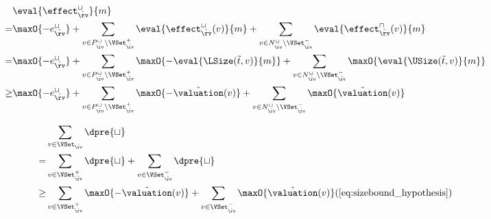 \begin{equation} \label{eq:input_rv_reduction_lower}
  \begin{split}
  & \eval{\effect^\sqcup_{\hat{\rv}}}{m} \\
  = & \maxO{-e^{\sqcup}_{\hat{\rv}}}
    + \sum_{v \in P_{\hat{\rv}}^\sqcup \setminus \VSet^+_{\hat{\rv}}} \eval{\effect^\sqcup_{\hat{\rv}}(v)}{m}
    + \sum_{v \in N_{\hat{\rv}}^\sqcup \setminus \VSet^-_{\hat{\rv}}} \eval{\effect^\sqcap_{\hat{\rv}}(v)}{m} \\
  = & \maxO{-e^{\sqcup}_{\hat{\rv}}}
    + \sum_{v \in P_{\hat{\rv}}^\sqcup \setminus \VSet^+_{\hat{\rv}}} \maxO{-\eval{\LSize(\tilde{t}, v)}{m}}
    + \sum_{v \in N_{\hat{\rv}}^\sqcup \setminus \VSet^-_{\hat{\rv}}} \maxO{\eval{\USize(\tilde{t}, v)}{m}} \\
  \geq & \maxO{-e^{\sqcup}_{\hat{\rv}}}
    + \sum_{v \in P_{\hat{\rv}}^\sqcup \setminus \VSet^+_{\hat{\rv}}} \maxO{-\tilde{\valuation}(v)}
    + \sum_{v \in N_{\hat{\rv}}^\sqcup \setminus \VSet^-_{\hat{\rv}}} \maxO{\tilde{\valuation}(v)} \\
  \end{split}
\end{equation}

\begin{equation} \label{eq:d_lower_reduction}
  \begin{split} 
  & \sum_{v \in \VSet_{\hat{\rv}}} \dpre{\sqcup} \\
  = & \sum_{v \in \VSet^+_{\hat{\rv}}} \dpre{\sqcup} + \sum_{v \in \VSet^-_{\hat{\rv}}} \dpre{\sqcup} \\
  \geq & \sum_{v \in \VSet^+_{\hat{\rv}}} \maxO{-\tilde{\valuation}(v)} + \sum_{v \in \VSet^-_{\hat{\rv}}} \maxO{\tilde{\valuation}(v)} (\ref{eq:sizebound_hypothesis}) \\
  \end{split}      
\end{equation}

